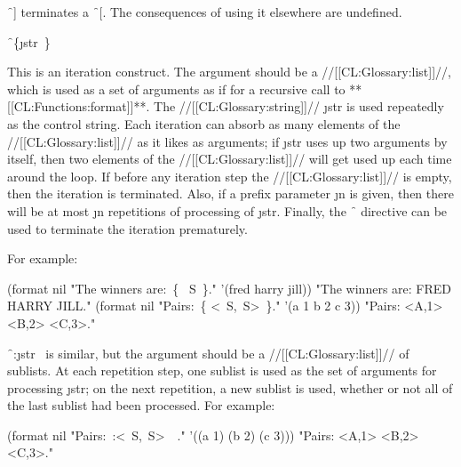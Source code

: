 \endsubsubsection%




\f{~]} terminates a \f{~[}.
The consequences of using it elsewhere are undefined.

\endsubsubsection%



\f{~\{\j{str}~\}}

This is an iteration construct.  The argument should be a //[[CL:Glossary:list]]//,
which is used as a set of arguments 
as if for a recursive call to **[[CL:Functions:format]]**.
The //[[CL:Glossary:string]]// \j{str} is used repeatedly as the control string.
Each iteration can absorb as many elements of the //[[CL:Glossary:list]]// as it likes
as arguments;
if \j{str} uses up two arguments by itself, then two elements of the
//[[CL:Glossary:list]]// will get used up each time around the loop.
If before any iteration step the //[[CL:Glossary:list]]// 
is empty, then the iteration is terminated.
Also, if a prefix parameter \j{n} is given, then there will be at most \j{n}
repetitions of processing of \j{str}.  
Finally, the \f{~\hat } directive can be
used to terminate the iteration prematurely.


For example:
                                                                       
\code
 (format nil "The winners are:~\{ ~S~\}." 
         '(fred harry jill)) 
\EV "The winners are: FRED HARRY JILL."                           
 (format nil "Pairs:~\{ <~S,~S>~\}." 
         '(a 1 b 2 c 3))
\EV "Pairs: <A,1> <B,2> <C,3>."
\endcode


\f{~:\lbr \j{str}~\rbr  } is similar, 
but the argument should be a //[[CL:Glossary:list]]// of sublists.
At each repetition step, one sublist 
is used as the set of arguments for
processing \j{str}; on the next repetition, a new sublist 
is used, whether
or not all of the last sublist had been processed.  
For example:

                                                                               

\code
 (format nil "Pairs:~:\lbr <~S,~S>~\rbr\ ." 
                 '((a 1) (b 2) (c 3)))
\EV "Pairs: <A,1> <B,2> <C,3>."
\endcode


